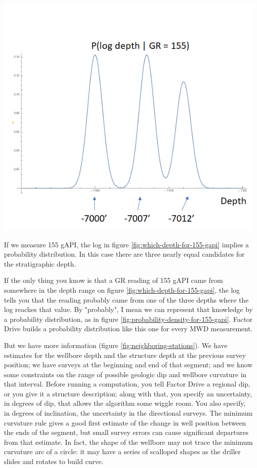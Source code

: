 \documentclass{tufte-handout}
\begin{document}
\begin{marginfigure}
  \includegraphics{probability-density-for-155-gapi.png}
  \caption{If we measure 155 gAPI, the log in figure \ref{fig:which-depth-for-155-gapi} implies
  a probability distribution. In this case there are three nearly equal candidates for the 
  stratigraphic depth.}
  \label{fig:probability-density-for-155-gapi}
\end{marginfigure}

If the only thing you know is that a GR reading of 155 gAPI came from somewhere in the depth range on figure
\ref{fig:which-depth-for-155-gapi}, the log tells you that the reading probably came from one of the three depths where the log reaches that value. By "probably", I mean we can represent that knowledge by a
probability distribution, as in figure \ref{fig:probability-density-for-155-gapi}. Factor Drive 
builds a probability distribution like this one for every MWD measurement.

But we have more information (figure \ref{fig:neighboring-stations}). We have estimates for the wellbore depth and the structure depth 
at the previous survey position; we have surveys at the beginning and end of that segment; and we know
some constraints on the range of possible geologic dip and wellbore curvature in that interval. Before
running a computation, you tell Factor Drive a regional dip, or you give it a structure description;
along with that, you specify an uncertainty, in degrees of dip, that allows the algorithm some wiggle
room. You also specify, in degrees of inclination, the uncertainty in the directional surveys. The
minimum curvature rule gives a good first estimate of the change in well position between
the ends of the segment, but small survey errors can cause significant departures from that estimate.
In fact, the shape of the wellbore may not trace the minimum curvature arc of a circle: it 
may have a series of scalloped shapes as the driller slides and rotates to build curve. 
\end{document}
